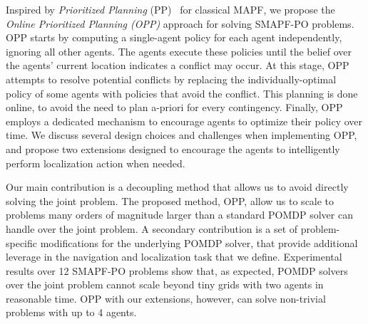 \documentclass[letterpaper]{article} %
\begin{document}
Inspired by \emph{Prioritized Planning} (PP)~\cite{silver2005cooperative} for classical MAPF, 
we propose the \emph{Online Prioritized Planning (OPP)} approach for solving SMAPF-PO problems. 
OPP starts by computing a single-agent policy for each agent independently, ignoring all other agents. 
The agents execute these policies until the belief over the agents' current location indicates a conflict may occur. %
At this stage, OPP attempts to resolve potential conflicts by replacing the individually-optimal policy of some agents with policies that avoid the conflict. This planning is done online, to avoid the need to plan a-priori for every contingency. Finally, OPP employs a dedicated mechanism to encourage agents to optimize their policy over time. 
We discuss several design choices and challenges when implementing OPP, and propose two extensions designed to encourage the agents to intelligently perform localization action when needed.  

Our main contribution is a decoupling method that allows us to avoid directly solving the joint problem. The proposed method, OPP, allow us to scale to problems many orders of magnitude larger than a standard POMDP solver can handle over the joint problem. A secondary contribution is a set of problem-specific modifications for the underlying POMDP solver, that provide additional leverage in the navigation and localization task that we define. 
Experimental results over 12 SMAPF-PO problems show that, as expected, POMDP solvers over the joint problem cannot scale beyond tiny grids with two agents in reasonable time. OPP with our extensions, however, can solve non-trivial problems with up to 4 agents.%



  
\end{document}
